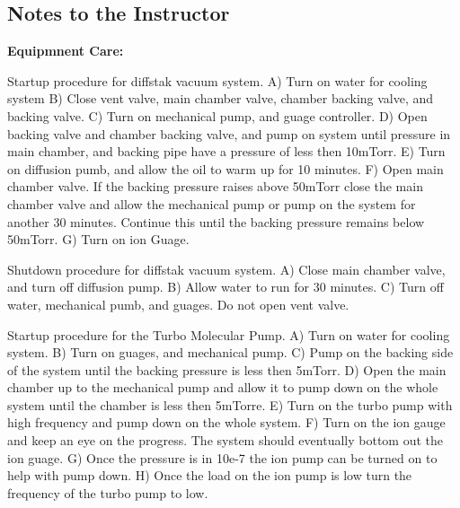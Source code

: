 \documentclass{book}
\begin{document}
\newpage

{\subsection{Notes to the Instructor}
{\bf Equipmnent Care:}

Startup procedure for diffstak vacuum system.\newline
A) Turn on water for cooling system\newline
B) Close vent valve, main chamber valve, chamber backing valve, and backing valve.\newline
C) Turn on mechanical pump, and guage controller.\newline
D) Open backing valve and chamber backing valve, and pump on system until pressure in main chamber, and backing pipe have a pressure of less then 10mTorr.\newline
E) Turn on diffusion pumb, and allow the oil to warm up for 10 minutes.\newline
F) Open main chamber valve. If the backing pressure raises above 50mTorr close the main chamber valve and allow the mechanical pump or pump on the system for another 30 minutes. Continue this until the backing pressure remains below 50mTorr.\newline
G) Turn on ion Guage.\newline

Shutdown procedure for diffstak vacuum system.\newline
A) Close main chamber valve, and turn off diffusion pump.\newline 
B) Allow water to run for 30 minutes.\newline
C) Turn off water, mechanical pumb, and guages. Do not open vent valve.\newline

Startup procedure for the Turbo Molecular Pump.\newline
A) Turn on water for cooling system.\newline
B) Turn on guages, and mechanical pump.\newline
C) Pump on the backing side of the system until the backing pressure is less then 5mTorr.\newline
D) Open the main chamber up to the mechanical pump and allow it to pump down on the whole system until the chamber is less then 5mTorre.\newline
E) Turn on the turbo pump with high frequency and pump down on the whole system.\newline
F) Turn on the ion gauge and keep an eye on the progress. The system should eventually bottom out the ion guage.\newline
G) Once the pressure is in 10e-7 the ion pump can be turned on to help with pump down.\newline
H) Once the load on the ion pump is low turn the frequency of the turbo pump to low.\newline

}
\end{document}
